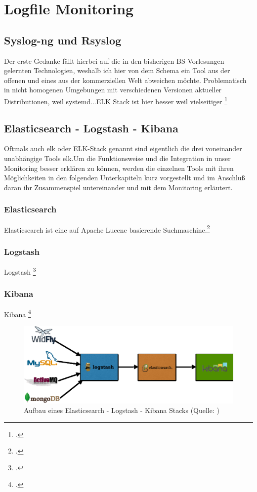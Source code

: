 \documentclass[12pt,a4paper,parskip]{scrreprt}
\begin{document}
	\section{Logfile Monitoring}
	\subsection{Syslog-ng und Rsyslog}
	Der erste Gedanke fällt hierbei auf die in den bisherigen BS Vorlesungen gelernten Technologien, weshalb ich hier von dem Schema ein Tool aus der offenen und eines aus der kommerziellen Welt abweichen möchte.
	Problematisch in nicht homogenen Umgebungen mit verschiedenen Versionen aktueller Distributionen, weil systemd...ELK Stack ist hier besser weil vielseitiger
	\footcite{systemd2015}
	\subsection{Elasticsearch - Logstash - Kibana}
	Oftmals auch \acrshort{elk} oder ELK-Stack genannt sind eigentlich die drei voneinander unabhängige Tools \acrlong{elk}.Um die Funktionsweise und die Integration in unser Monitoring besser erklären zu können, werden die einzelnen Tools mit ihren Möglichkeiten in den folgenden Unterkapiteln kurz vorgestellt und im Anschluß daran ihr Zusammenspiel untereinander und mit dem Monitoring erläutert.
	\subsubsection{Elasticsearch}
	Elasticsearch ist eine auf Apache Lucene basierende Suchmaschine.\footcite{elasticsearch}
	\subsubsection{Logstash}
	Logstash \footcite{logstash}
	\subsubsection{Kibana}
	Kibana \footcite{kibana}
	\begin{figure}[h!]
		\centering
		\includegraphics[width=1\textwidth]{pics/elk-stack.eps}
		\caption[Aufbau eines Elasticsearch - Logstash - Kibana Stacks]{Aufbau eines Elasticsearch - Logstash - Kibana Stacks (Quelle: \textcite{elkstackpic})}
		\label{fig:elk}
	\end{figure}
	\clearpage
\end{document}

